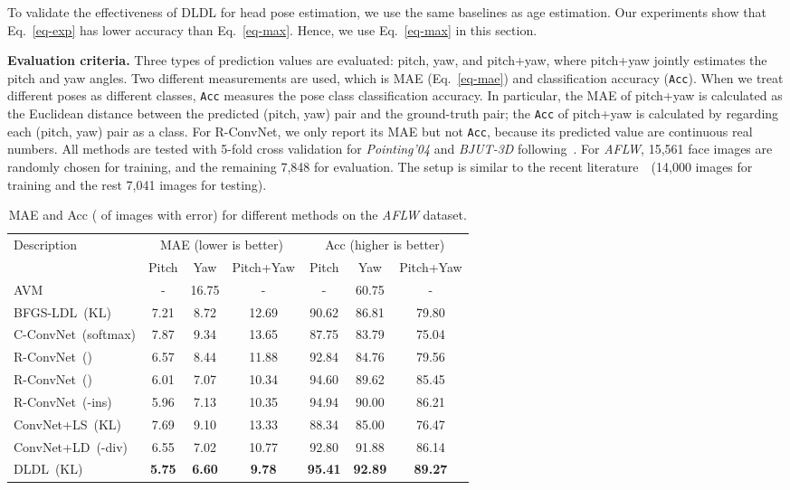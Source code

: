 \documentclass[journal]{IEEEtran}
\begin{document}
To validate the effectiveness of DLDL for head pose estimation, we use the same baselines as age estimation. Our experiments show that Eq.~\ref{eq-exp} has lower accuracy than Eq.~\ref{eq-max}. Hence, we use Eq.~\ref{eq-max} in this section.

\textbf{Evaluation criteria.} Three types of prediction values are evaluated: pitch, yaw, and pitch+yaw, where pitch+yaw jointly estimates the pitch and yaw angles. Two different measurements are used, which is MAE (Eq.~\ref{eq-mae}) and classification accuracy (\texttt{Acc}). When we treat different poses as different classes, \texttt{Acc} measures the pose class classification accuracy. In particular, the MAE of pitch+yaw is calculated as the Euclidean distance between the predicted (pitch, yaw) pair and the ground-truth  pair; the \texttt{Acc} of pitch+yaw is calculated by regarding each (pitch, yaw) pair as a class. For R-ConvNet, we only report its MAE but not \texttt{Acc}, because its predicted value are continuous real numbers. All methods are tested with 5-fold cross validation for \emph{Pointing'04} and \emph{BJUT-3D} following~\cite{geng2014head}. For \emph{AFLW}, 15,561 face images are randomly chosen for training, and the remaining 7,848 for evaluation. The setup is similar to the recent literature~\cite{sundararajan2015head}~(14,000 images for training and the rest 7,041 images for testing).

\begin{table}
 \centering
 \caption{MAE and Acc ( of images with  error) for different methods on the \emph{AFLW} dataset.} \label{table:pose-af}
 \footnotesize
 \setlength{\tabcolsep}{2pt}
 \begin{tabular}{|l|ccc|ccc|}
  \hline
 \multirow{2}{*}{Description}  &\multicolumn{3}{c|}{MAE (lower is better)} &\multicolumn{3}{c|}{Acc (higher is better)}\\
     &Pitch &Yaw &Pitch+Yaw &Pitch &Yaw &Pitch+Yaw\\
    \hline \hline
    AVM~\cite{sundararajan2015head}   &- &16.75 &- &- &60.75 &-\\
   \hline \hline
   BFGS-LDL~(KL)     &7.21  &8.72 &12.69 &90.62 &86.81 &79.80\\
   C-ConvNet~(softmax) &7.87  &9.34 &13.65 &87.75 &83.79 &75.04 \\
  R-ConvNet~() &6.57  &8.44 &11.88 &92.84 &84.76 &79.56 \\
  R-ConvNet~() &6.01  &7.07 &10.34 &94.60 &89.62 &85.45 \\
  R-ConvNet~(-ins) &5.96 &7.13 	&10.35 	&94.94 &90.00 &86.21\\
  ConvNet+LS~(KL)     &7.69  &9.10 &13.33 &88.34 &85.00 &76.47 \\
  ConvNet+LD~(-div) &6.55 &7.02 &10.77 &92.80 &91.88 &86.14\\
  \hline \hline
  DLDL~(KL) &\textbf{5.75} &\textbf{6.60} &\textbf{9.78} &\textbf{95.41} &\textbf{92.89} &\textbf{89.27}\\
  \hline
 \end{tabular}
\end{table}
\end{document}
